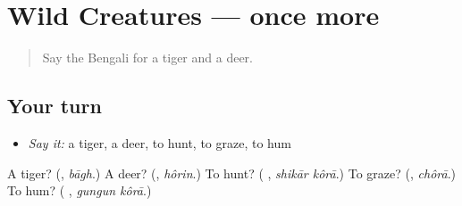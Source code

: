 \section[(dialogue)]{Wild Creatures — once more}

\label{lesson:BN-R437-review-final-437}



\begin{quote}
Say the Bengali for a tiger and a deer.
\end{quote}

\subsection*{Your turn}
\begin{itemize}
\raggedright
  \item \emph{Say it:} a tiger, a deer, to hunt, to graze, to hum
\end{itemize}

\begin{tcolorbox}[breakable,colback=teal!4,colframe=teal!35!black,title={Before you move on}]
A tiger? (\textbf{}, \emph{bāgh}.) A deer? (\textbf{}, \emph{hôrin}.) To hunt? (\textbf{ }, \emph{shikār kôrā}.) To graze? (\textbf{}, \emph{chôrā}.) To hum? (\textbf{ }, \emph{gungun kôrā}.)
\end{tcolorbox}
